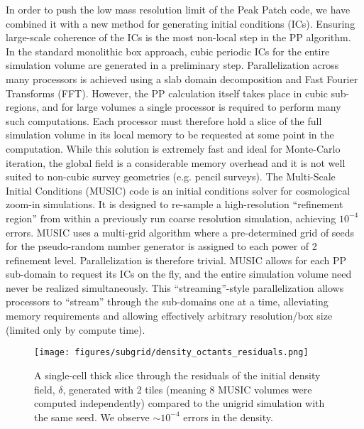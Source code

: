 In order to push the low mass resolution limit of the Peak Patch code, we have combined it with a new method for generating initial conditions (ICs). Ensuring large-scale coherence of the ICs is the most non-local step in the PP algorithm. In the standard monolithic box approach, cubic periodic ICs for the entire simulation volume are generated in a preliminary step. Parallelization across many processors is achieved using a slab domain decomposition and Fast Fourier Transforms (FFT). However, the PP calculation itself takes place in cubic sub-regions, and for large volumes a single processor is required to perform many such computations. Each processor must therefore hold a slice of the full simulation volume in its local memory to be requested at some point in the computation. While this solution is extremely fast and ideal for Monte-Carlo iteration, the global field is a considerable memory overhead and it is not well suited to non-cubic survey geometries (e.g. pencil surveys). The Multi-Scale Initial Conditions (MUSIC) \citep{music} code is an initial conditions solver for cosmological zoom-in simulations. It is designed to re-sample a high-resolution ``refinement region'' from within a previously run coarse resolution simulation, achieving $10^{-4}$ errors. MUSIC uses a multi-grid algorithm where a pre-determined grid of seeds for the pseudo-random number generator is assigned to each power of 2 refinement level. Parallelization is therefore trivial. MUSIC allows for each PP sub-domain to request its ICs on the fly, and the entire simulation volume need never be realized simultaneously. This ``streaming''-style parallelization allows processors to ``stream'' through the sub-domains one at a time, alleviating memory requirements and allowing effectively arbitrary resolution/box size (limited only by compute time).

\begin{figure}[h!] %
\begin{center}
\texttt{[image: figures/subgrid/density\_octants\_residuals.png]}%
\caption{A single-cell thick slice through the residuals of the initial density field, $\delta$, generated with 2 tiles (meaning 8 MUSIC volumes were computed independently) compared to the unigrid simulation with the same seed. We observe $\sim 10^{-4}$ errors in the density.}
\label{density_octants_residuals}
\end{center}
\end{figure}

